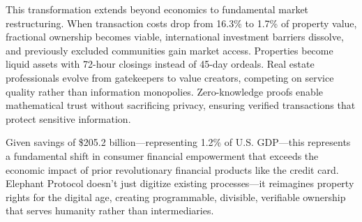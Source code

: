 This transformation extends beyond economics to fundamental market restructuring. When transaction costs drop from 16.3\% to 1.7\% of property value, fractional ownership becomes viable, international investment barriers dissolve, and previously excluded communities gain market access. Properties become liquid assets with 72-hour closings instead of 45-day ordeals. Real estate professionals evolve from gatekeepers to value creators, competing on service quality rather than information monopolies. Zero-knowledge proofs enable mathematical trust without sacrificing privacy, ensuring verified transactions that protect sensitive information.

Given savings of \$205.2 billion---representing 1.2\% of U.S. GDP---this represents a fundamental shift in consumer financial empowerment that exceeds the economic impact of prior revolutionary financial products like the credit card. Elephant Protocol doesn't just digitize existing processes---it reimagines property rights for the digital age, creating programmable, divisible, verifiable ownership that serves humanity rather than intermediaries.